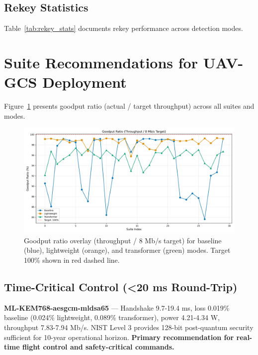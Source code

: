 \documentclass[11pt,a4paper]{article}
\begin{document}
\subsection{Rekey Statistics}

Table~\ref{tab:rekey_stats} documents rekey performance across detection modes.



\section{Suite Recommendations for UAV-GCS Deployment}

Figure~\ref{fig:goodput_ratio} presents goodput ratio (actual / target throughput) across all suites and modes.

\begin{figure}[H]
\centering
\includegraphics[width=\textwidth]{../figures/figure13_goodput_ratio_overlay.png}
\caption{Goodput ratio overlay (throughput / 8 Mb/s target) for baseline (blue), lightweight (orange), and transformer (green) modes. Target 100\% shown in red dashed line.}
\label{fig:goodput_ratio}
\end{figure}

\subsection{Time-Critical Control (<20 ms Round-Trip)}

\textbf{ML-KEM768-aesgcm-mldsa65} — Handshake 9.7-19.4 ms, loss 0.019\% baseline (0.024\% lightweight, 0.089\% transformer), power 4.21-4.34 W, throughput 7.83-7.94 Mb/s. NIST Level 3 provides 128-bit post-quantum security sufficient for 10-year operational horizon. \textbf{Primary recommendation for real-time flight control and safety-critical commands.}
\end{document}
